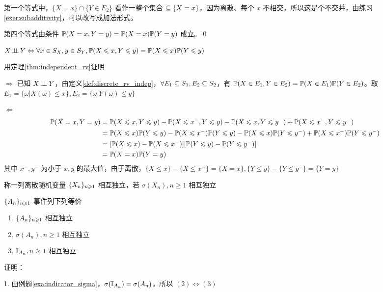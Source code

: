 第一个等式中，$\{X=x\}\cap \{Y\in E_2\}$ 看作一整个集合 $\subseteq \{X=x\}$，因为离散、每个 $x$ 不相交，所以这是个不交并，由练习\ref{exer:subadditivity}，可以改写成加法形式。

第四个等式由条件 $\mathbb{P}(X=x,Y=y)=\mathbb{P}(X=x)\mathbb{P}(Y=y)$ 成立。\qed

\begin{theorem}
    $X\operatorname{\perp\!\!\!\perp} Y\Leftrightarrow \forall x\in S_X,y\in S_Y, \mathbb{P}(X\leqslant x,Y\leqslant y)=\mathbb{P}(X\leqslant x)\mathbb{P}(Y\leqslant y)$
\end{theorem}

用定理\ref{thm:independent_rv}证明

$\Rightarrow$ 已知 $X\operatorname{\perp\!\!\!\perp} Y$，由定义\ref{def:discrete_rv_indep}，$\forall E_1\subseteq S_1,E_2\subseteq S_2$，有 $\mathbb{P}(X\in E_1,Y\in E_2)=\mathbb{P}(X\in E_1)\mathbb{P}(Y\in E_2)$。取 $E_1=\{\omega|X(\omega)\leq x\}, E_2=\{\omega|Y(\omega)\leq y\}$

$\Leftarrow$
\[
\begin{aligned}
    \mathbb{P}(X=x,Y=y)&=\mathbb{P}(X\leqslant x,Y\leqslant y)-\mathbb{P}(X\leqslant x^-,Y\leqslant y)-\mathbb{P}(X\leqslant x,Y\leqslant y^-)+\mathbb{P}(X\leqslant x^-,Y\leqslant y^-)\\
    &=\mathbb{P}(X\leqslant x)\mathbb{P}(Y\leqslant y)-\mathbb{P}(X\leqslant x^-)\mathbb{P}(Y\leqslant y)-\mathbb{P}(X\leqslant x)\mathbb{P}(Y\leqslant y^-)+\mathbb{P}(X\leqslant x^-)\mathbb{P}(Y\leqslant y^-)\\
    &=[\mathbb{P}(X\leqslant x)-\mathbb{P}(X\leqslant x^-)][\mathbb{P}(Y\leqslant y)-\mathbb{P}(Y\leqslant y^-)]\\
    &=\mathbb{P}(X=x)\mathbb{P}(Y=y)
\end{aligned}
\]
其中 $x^-,y^-$ 为小于 $x,y$ 的最大值，由于离散，$\{X\leq x\}-\{X\leq x^-\}=\{X=x\}, \{Y\leq y\}-\{Y\leq y^-\}=\{Y=y\}$

\begin{definition}
    称一列离散随机变量 $\{{X}_{n}\}_{n \geqslant 1}$ 相互独立，若 $\sigma(X_n), n\geq 1$ 相互独立
\end{definition}

\begin{theorem}
    $\{{A}_{n}\}_{n \geqslant 1}$ 事件列下列等价
    \begin{enumerate}
        \item $\{{A}_{n}\}_{n \geqslant 1}$ 相互独立
        \item $\sigma(A_n), n\geq 1$ 相互独立
        \item $\mathbb I_{A_n}, n\geq 1$ 相互独立
    \end{enumerate}
\end{theorem}

证明：

1. 由例题\ref{exa:indicator_sigma}，$\sigma(\mathbb I_{A_n})=\sigma(A_n)$，所以 $(2)\Leftrightarrow (3)$

